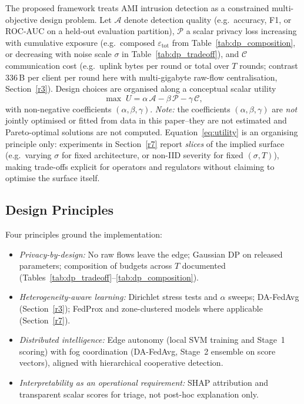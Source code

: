 \documentclass[sensors,article,submit,pdftex,moreauthors]{Definitions/mdpi}
\begin{document}
The proposed framework treats AMI intrusion detection as a constrained multi-objective design problem. Let $\mathcal{A}$ denote detection quality (e.g.\ accuracy, F1, or ROC-AUC on a held-out evaluation partition), $\mathcal{P}$ a scalar privacy loss increasing with cumulative exposure (e.g.\ composed $\varepsilon_{\mathrm{tot}}$ from Table~\ref{tab:dp_composition}, or decreasing with noise scale $\sigma$ in Table~\ref{tab:dp_tradeoff}), and $\mathcal{C}$ communication cost (e.g.\ uplink bytes per round or total over $T$ rounds; contrast 336\,B per client per round here with multi-gigabyte raw-flow centralisation, Section~\ref{r3}). Design choices are organised along a conceptual scalar utility
\begin{equation}
\max \; U = \alpha\,\mathcal{A} - \beta\,\mathcal{P} - \gamma\,\mathcal{C},
\label{eq:utility}
\end{equation}
with non-negative coefficients $(\alpha,\beta,\gamma)$. \textit{Note:} the coefficients $(\alpha,\beta,\gamma)$ are \textit{not} jointly optimised or fitted from data in this paper--they are not estimated and Pareto-optimal solutions are not computed. Equation~\eqref{eq:utility} is an organising principle only: experiments in Section~\ref{r7} report \textit{slices} of the implied surface (e.g.\ varying $\sigma$ for fixed architecture, or non-IID severity for fixed $(\sigma,T)$), making trade-offs explicit for operators and regulators without claiming to optimise the surface itself.

\subsection{Design Principles}\label{sec:design_principles}

Four principles ground the implementation:
\begin{itemize}
  \item \textit{Privacy-by-design:} No raw flows leave the edge; Gaussian DP on released parameters; composition of budgets across $T$ documented (Tables~\ref{tab:dp_tradeoff}--\ref{tab:dp_composition}).
  \item \textit{Heterogeneity-aware learning:} Dirichlet stress tests and $\alpha$ sweeps; DA-FedAvg (Section~\ref{r3}); FedProx and zone-clustered models where applicable (Section~\ref{r7}).
  \item \textit{Distributed intelligence:} Edge autonomy (local SVM training and Stage~1 scoring) with fog coordination (DA-FedAvg, Stage~2 ensemble on score vectors), aligned with hierarchical cooperative detection.
  \item \textit{Interpretability as an operational requirement:} SHAP attribution and transparent scalar scores for triage, not post-hoc explanation only.
\end{itemize}
\end{document}
